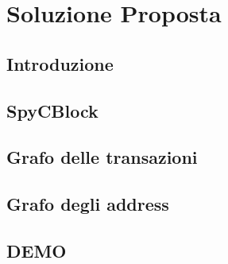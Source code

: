 \chapter{Soluzione Proposta}\label{chap:soluzioneproposta}

\section{Introduzione} \label{sec:solIntroduction}

\section{SpyCBlock} \label{sec:spycblock}

\section{Grafo delle transazioni} \label{sec:solGraphTX}

\section{Grafo degli address} \label{sec:solGraphAddress}

\section{DEMO} \label{sec:solDemo}
